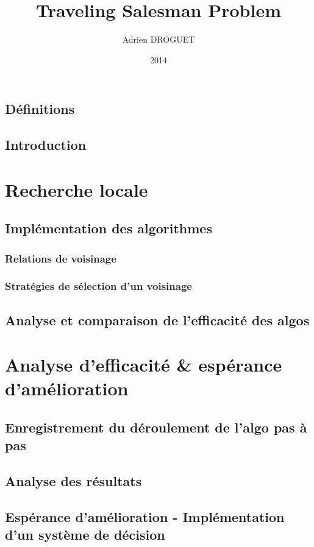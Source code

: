 \documentclass[a4paper,10pt]{report}
\title{Traveling Salesman Problem}
\author{Adrien DROGUET}
\date{2014}
\begin{document}
\maketitle

\tableofcontents
\pagebreak

\section{Définitions}

\section{Introduction}

\chapter{Recherche locale}
\section{Implémentation des algorithmes}
\subsection{Relations de voisinage}

\subsection{Stratégies de sélection d'un voisinage}

\section{Analyse et comparaison de l'efficacité des algos}


\chapter{Analyse d'efficacité \& espérance d'amélioration}
\section{Enregistrement du déroulement de l'algo pas à pas}

\section{Analyse des résultats}

\section{Espérance d'amélioration - Implémentation d'un système de décision}
\end{document}
